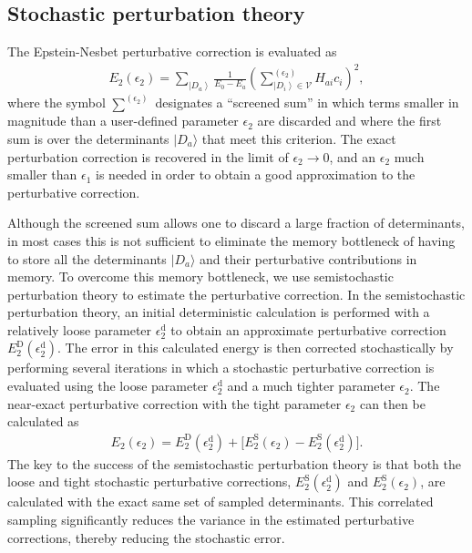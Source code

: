 \documentclass[10pt,aps,prb,twocolumn,amsmath,amssymb,superscriptaddress]{revtex4-1}
\newcommand{\ket}[1]{\left|  #1  \right\rangle}
\begin{document}
\subsection{Stochastic perturbation theory}

The Epstein-Nesbet perturbative correction is evaluated as
\begin{align}
	E_2(\epsilon_2)=
    \sum_{\ket{D_a}}\frac{1}{E_0-E_a}
    \left(\sum_{\ket{D_i}\in\mathcal{V}}^{(\epsilon_2)} H_{ai}c_i\right)^2, \label{eq:pt_hci}
\end{align}
where the symbol $\sum^{(\epsilon_2)}$ designates a ``screened sum'' in which terms smaller in magnitude than a user-defined parameter $\epsilon_2$ are discarded and where the first sum is over the determinants $|D_a\rangle$ that meet this criterion. The exact perturbation correction is recovered in the limit of $\epsilon_2 \rightarrow 0$, and an $\epsilon_2$ much smaller than $\epsilon_1$ is needed in order to obtain a good approximation to the perturbative correction.	

Although the screened sum allows one to discard a large fraction of determinants, in most cases this is not sufficient to eliminate the memory bottleneck of having to store all the determinants $|D_a\rangle$ and their perturbative contributions in memory. To overcome this memory bottleneck, we use semistochastic perturbation theory\cite{ShaHolUmr-JCTC-17} to estimate the perturbative correction. In the semistochastic perturbation theory, an initial deterministic calculation
is performed with a relatively loose parameter $\epsilon_2^\text{d}$ to obtain an approximate perturbative correction $E_2^\text{D}(\epsilon_2^\text{d})$. The error in this calculated energy is then corrected stochastically by performing several iterations in which a stochastic perturbative correction is evaluated using the loose parameter $\epsilon_2^\text{d}$ and a much tighter parameter $\epsilon_2$. The near-exact perturbative correction with the tight parameter $\epsilon_2$ can then be calculated as 
\begin{align}
    E_2(\epsilon_2) =  E_2^\text{D}(\epsilon_2^\text{d}) + \bigg[ E_2^\text{S}(\epsilon_2) -  E_2^\text{S}(\epsilon_2^\text{d})\bigg] \label{eq:semistoc}
.\end{align}
The key to the success of the semistochastic perturbation theory is that both the loose and tight stochastic perturbative corrections, $E_2^\text{S}(\epsilon_2^\text{d})$ and $E_2^\text{S}(\epsilon_2)$, are calculated with the exact same set of sampled determinants. This correlated sampling significantly reduces the variance in the estimated perturbative corrections, thereby reducing the stochastic error.
\end{document}
